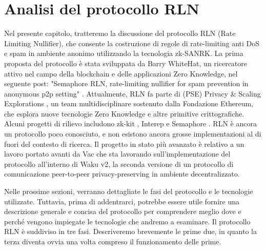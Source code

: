 \chapter{Analisi del protocollo RLN}
\label{chap:rln-protocol}

Nel presente capitolo, tratteremo la discussione del protocollo RLN (Rate Limiting Nullifier), che consente la
costruzione di regole di rate-limiting anti DoS e spam in ambiente anonimo utilizzando la tecnologia zk-SANRK. La prima proposta del protocollo è stata
sviluppata da Barry WhiteHat, un ricercatore attivo nel campo della blockchain e delle applicazioni Zero Knowledge, nel
seguente post: "Semaphore RLN, rate-limiting nullifier for spam prevention in anonymous p2p setting" \cite{semaphore-rln}. Attualmente, RLN
fa parte di (PSE) Privacy \& Scaling Explorations \cite{pse}, un team multidisciplinare sostenuto dalla Fondazione Ethereum, che
esplora nuove tecnologie Zero Knowledge e altre primitive crittografiche. Alcuni progetti di rilievo includono zk-kit \cite{zk-kit},
Interep \cite{interep} e Semaphore \cite{semaphore}. RLN è ancora un protocollo poco conosciuto, e non esistono ancora grosse implementazioni al di
fuori del contesto di ricerca. Il progetto in stato più avanzato è relativo a un lavoro portato avanti da Vac che sta
lavorando sull'implementazione del protocollo all'interno di Waku v2, la seconda versione di un protocollo di
comunicazione peer-to-peer privacy-preserving in ambiente decentralizzato.

Nelle prossime sezioni, verranno dettagliate le fasi del protocollo e le tecnologie utilizzate. Tuttavia, prima di
addentrarci, potrebbe essere utile fornire una descrizione generale e concisa del protocollo per comprendere meglio dove
e perché vengono impiegate le tecnologie che andremo a esaminare. Il protocollo RLN è suddiviso in tre fasi. Descriveremo brevemente le prime due, in quanto la terza diventa ovvia una volta compreso il funzionamento delle prime.

